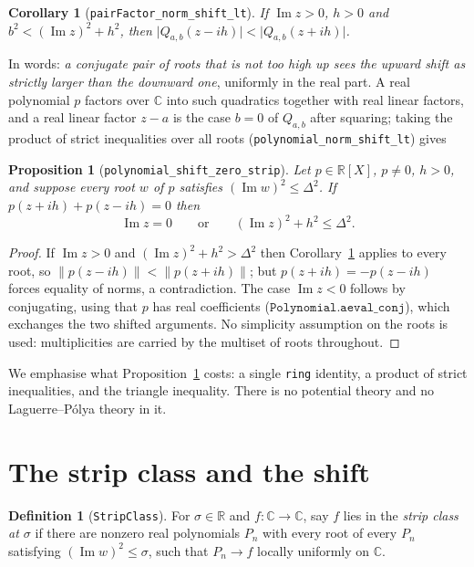 \documentclass[11pt]{article}
\newtheorem{proposition}[theorem]{Proposition}
\newtheorem{corollary}[theorem]{Corollary}
\theoremstyle{definition}
\newtheorem{definition}[theorem]{Definition}
\DeclareMathOperator{\Imop}{Im}
\begin{document}
\begin{corollary}[\texttt{pairFactor\_norm\_shift\_lt}]\label{cor:core}
If $\Imop z>0$, $h>0$ and $b^{2}<(\Imop z)^{2}+h^{2}$, then
$\bigl|Q_{a,b}(z-ih)\bigr|<\bigl|Q_{a,b}(z+ih)\bigr|$.
\end{corollary}

\noindent In words: \emph{a conjugate pair of roots that is not too high up sees the upward shift as
strictly larger than the downward one}, uniformly in the real part.  A real polynomial $p$ factors
over $\mathbb C$ into such quadratics together with real linear factors, and a real linear factor
$z-a$ is the case $b=0$ of $Q_{a,b}$ after squaring; taking the product of strict inequalities over
all roots (\texttt{polynomial\_norm\_shift\_lt}) gives

\begin{proposition}[\texttt{polynomial\_shift\_zero\_strip}]\label{prop:polystep}
Let $p\in\mathbb R[X]$, $p\ne0$, $h>0$, and suppose every root $w$ of $p$ satisfies
$(\Imop w)^{2}\le\Delta^{2}$.  If $p(z+ih)+p(z-ih)=0$ then
\[
  \Imop z=0 \qquad\text{or}\qquad (\Imop z)^{2}+h^{2}\le\Delta^{2}.
\]
\end{proposition}

\begin{proof}
If $\Imop z>0$ and $(\Imop z)^{2}+h^{2}>\Delta^{2}$ then Corollary~\ref{cor:core} applies to every
root, so $\|p(z-ih)\|<\|p(z+ih)\|$; but $p(z+ih)=-p(z-ih)$ forces equality of norms, a contradiction.
The case $\Imop z<0$ follows by conjugating, using that $p$ has real coefficients
($\texttt{Polynomial.aeval\_conj}$), which exchanges the two shifted arguments.  No simplicity
assumption on the roots is used: multiplicities are carried by the multiset of roots throughout.
\end{proof}

We emphasise what Proposition~\ref{prop:polystep} costs: a single \texttt{ring} identity, a product of
strict inequalities, and the triangle inequality.  There is no potential theory and no
Laguerre--P\'olya theory in it.

\section{The strip class and the shift}\label{sec:class}

\begin{definition}[\texttt{StripClass}]
For $\sigma\in\mathbb R$ and $f:\mathbb C\to\mathbb C$, say $f$ lies in the \emph{strip class at
$\sigma$} if there are nonzero real polynomials $P_n$ with every root of every $P_n$ satisfying
$(\Imop w)^{2}\le\sigma$, such that $P_n\to f$ locally uniformly on $\mathbb C$.
\end{definition}
\end{document}
